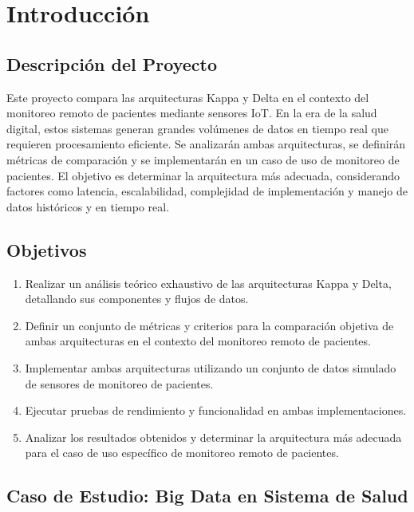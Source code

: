 \chapter{Introducción}


\section{Descripción del Proyecto}

Este proyecto compara las arquitecturas Kappa y Delta en el contexto del monitoreo remoto de pacientes mediante sensores IoT. 
En la era de la salud digital, estos sistemas generan grandes volúmenes de datos en tiempo real que requieren procesamiento eficiente. Se analizarán ambas arquitecturas, 
se definirán métricas de comparación y se implementarán en un caso de uso de monitoreo de pacientes. 
El objetivo es determinar la arquitectura más adecuada, considerando factores como latencia, escalabilidad, complejidad de implementación y manejo de datos históricos y en tiempo real.

\newpage

\section{Objetivos}

\begin{enumerate}
    \item Realizar un análisis teórico exhaustivo de las arquitecturas Kappa y Delta, detallando sus componentes y flujos de datos.
    
    \item Definir un conjunto de métricas y criterios para la comparación objetiva de ambas arquitecturas en el contexto del monitoreo remoto de pacientes.
    
    \item Implementar ambas arquitecturas utilizando un conjunto de datos simulado de sensores de monitoreo de pacientes.
    
    \item Ejecutar pruebas de rendimiento y funcionalidad en ambas implementaciones.
    
    \item Analizar los resultados obtenidos y determinar la arquitectura más adecuada para el caso de uso específico de monitoreo remoto de pacientes.
\end{enumerate}

\newpage

\section{Caso de Estudio: Big Data en Sistema de Salud}

